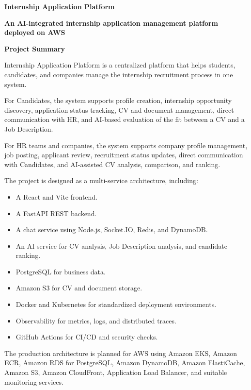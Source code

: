 \vspace{0.5em}\noindent\textbf{Internship Application
Platform}\par

\textbf{An AI-integrated internship application management platform
deployed on AWS}

\vspace{0.5em}\noindent\textbf{Project Summary}\par

Internship Application Platform is a centralized platform that helps
students, candidates, and companies manage the internship recruitment
process in one system.

For Candidates, the system supports profile creation, internship
opportunity discovery, application status tracking, CV and document
management, direct communication with HR, and AI-based evaluation of the
fit between a CV and a Job Description.

For HR teams and companies, the system supports company profile
management, job posting, applicant review, recruitment status updates,
direct communication with Candidates, and AI-assisted CV analysis,
comparison, and ranking.

The project is designed as a multi-service architecture, including:

\begin{itemize}
\tightlist
\item
  A React and Vite frontend.
\item
  A FastAPI REST backend.
\item
  A chat service using Node.js, Socket.IO, Redis, and DynamoDB.
\item
  An AI service for CV analysis, Job Description analysis, and candidate
  ranking.
\item
  PostgreSQL for business data.
\item
  Amazon S3 for CV and document storage.
\item
  Docker and Kubernetes for standardized deployment environments.
\item
  Observability for metrics, logs, and distributed traces.
\item
  GitHub Actions for CI/CD and security checks.
\end{itemize}

The production architecture is planned for AWS using Amazon EKS, Amazon
ECR, Amazon RDS for PostgreSQL, Amazon DynamoDB, Amazon ElastiCache,
Amazon S3, Amazon CloudFront, Application Load Balancer, and suitable
monitoring services.

